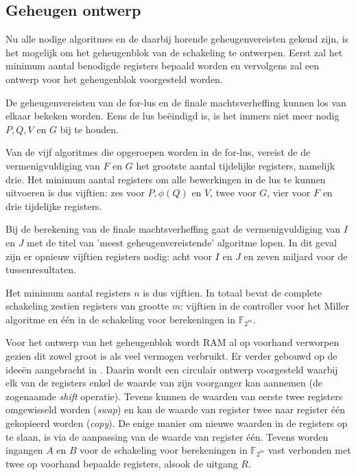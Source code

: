 \subsection{Geheugen ontwerp}

Nu alle nodige algoritmes en de daarbij horende geheugenvereisten gekend zijn, is het mogelijk om het geheugenblok van de schakeling te ontwerpen. Eerst zal het minimum aantal benodigde registers bepaald worden en vervolgens zal een ontwerp voor het geheugenblok voorgesteld worden.

De geheugenvereisten van de for-lus en de finale machtsverheffing kunnen los van elkaar bekeken worden. Eens de lus be\"eindigd is, is het immers niet meer nodig $P, Q, V$ en $G$ bij te houden.

Van de vijf algoritmes die opgeroepen worden in de for-lus, vereist de de vermenigvuldiging van $F$ en $G$ het grootste aantal tijdelijke registers, namelijk drie. Het minimum aantal registers om alle bewerkingen in de lus te kunnen uitvoeren is dus vijftien: zes voor $P, \phi(Q)$ en $V$, twee voor $G$, vier voor $F$ en drie tijdelijke registers.

Bij de berekening van de finale machtsverheffing gaat de vermenigvuldiging van $I$ en $J$ met de titel van 'meest geheugenvereistende' algoritme lopen. In dit geval zijn er opnieuw vijftien registers nodig: acht voor $I$ en $J$ en zeven miljard voor de tussenresultaten.

Het minimum aantal registers $n$ is dus vijftien. In totaal bevat de complete schakeling zestien registers van grootte $m$: vijftien in de controller voor het Miller algoritme en \'e\'en in de schakeling voor berekeningen in $\mathbb{F}_{2^m}$.

Voor het ontwerp van het geheugenblok wordt RAM al op voorhand verworpen gezien dit zowel groot is als veel vermogen verbruikt. Er verder gebouwd op de idee\"en aangebracht in \cite{lee}. Daarin wordt een circulair ontwerp voorgesteld waarbij elk van de registers enkel de waarde van zijn voorganger kan aannemen (de zogenaamde \emph{shift} operatie). Tevens kunnen de waarden van eerste twee registers omgewisseld worden (\emph{swap}) en kan de waarde van register twee naar register \'e\'en gekopieerd worden (\emph{copy}). De enige manier om nieuwe waarden in de registers op te slaan, is via de aanpassing van de waarde van register \'e\'en. Tevens worden ingangen $A$ en $B$ voor de schakeling voor berekeningen in $\mathbb{F}_{2^m}$ vast verbonden met twee op voorhand bepaalde registers, alsook de uitgang $R$. 

